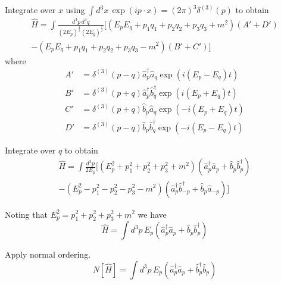 \documentclass[12pt]{article}
\begin{document}
Integrate over $x$ using $\int d^3x\,\exp(ip\cdot x)=(2\pi)^3\delta^{(3)}(p)$ to obtain
\begin{multline*}
\hat H
=\int\frac{d^3p\,d^3q}{(2E_p)^\frac{1}{2}(2E_q)^\frac{1}{2}}
\bigg[(E_pE_q+p_1q_1+p_2q_2+p_3q_3+m^2)(A'+D')
\\
-(E_pE_q+p_1q_1+p_2q_2+p_3q_3-m^2)(B'+C')\bigg]
\end{multline*}
where
\begin{align*}
A'&=\delta^{(3)}(p-q)\hat a_p^\dag\hat a_q\exp(i(E_p-E_q)t)
\\
B'&=\delta^{(3)}(p+q)\hat a_p^\dag\hat b_q^\dag\exp(i(E_p+E_q)t)
\\
C'&=\delta^{(3)}(p+q)\hat b_p\hat a_q\exp(-i(E_p+E_q)t)
\\
D'&=\delta^{(3)}(p-q)\hat b_p\hat b_q^\dag\exp(-i(E_p-E_q)t)
\end{align*}

Integrate over $q$ to obtain
\begin{multline*}
\hat H=\int\frac{d^3p}{2E_p}
\bigg[(E_p^2+p_1^2+p_2^2+p_3^2+m^2)
\left(\hat a_p^\dag\hat a_p+\hat b_p\hat b_p^\dag\right)
\\
-(E_p^2-p_1^2-p_2^2-p_3^2-m^2)
\left(\hat a_p^\dag\hat b_{-p}^\dag+\hat b_p\hat a_{-p}\right)\bigg]
\end{multline*}

Noting that $E_p^2=p_1^2+p_2^2+p_3^2+m^2$ we have
\begin{equation*}
\hat H=\int d^3p\,E_p\left(\hat a_p^\dag\hat a_p+\hat b_p\hat b_p^\dag\right)
\end{equation*}

Apply normal ordering.
\begin{equation*}
N[\hat H]=\int d^3p\,E_p\left(\hat a_p^\dag\hat a_p+\hat b_p^\dag\hat b_p\right)
\end{equation*}
\end{document}
